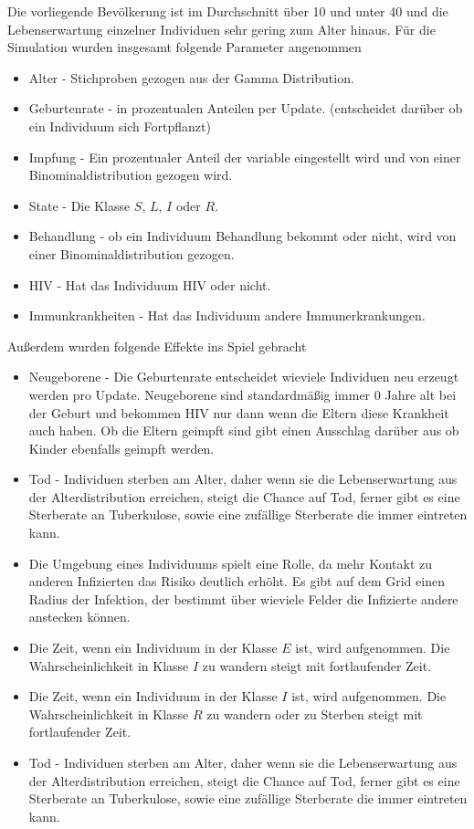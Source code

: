 \documentclass[paper=a4, fontsize=11pt, ngerman, abstract=on]{scrartcl}
\numberwithin{equation}{section} %
\numberwithin{figure}{section} %
\numberwithin{table}{section} %
\begin{document}
Die vorliegende Bevölkerung ist im Durchschnitt über 10 und unter 40 und die Lebenserwartung einzelner Individuen sehr gering zum Alter hinaus. Für die Simulation wurden insgesamt folgende Parameter angenommen

\begin{itemize}
  \item{Alter - Stichproben gezogen aus der Gamma Distribution.}
  \item{Geburtenrate - in prozentualen Anteilen per Update. (entscheidet darüber ob ein Individuum sich Fortpflanzt)}
  \item{Impfung - Ein prozentualer Anteil der variable eingestellt wird und von einer Binominaldistribution gezogen wird.}
  \item{State - Die Klasse $S$, $L$, $I$ oder $R$.}
  \item{Behandlung - ob ein Individuum Behandlung bekommt oder nicht, wird von einer Binominaldistribution gezogen.}
  \item{HIV - Hat das Individuum HIV oder nicht.}
  \item{Immunkrankheiten - Hat das Individuum andere Immunerkrankungen.}
\end{itemize}

Außerdem wurden folgende Effekte ins Spiel gebracht

\begin{itemize}
  \item{Neugeborene - Die Geburtenrate entscheidet wieviele Individuen neu erzeugt werden pro Update. Neugeborene sind standardmäßig immer 0 Jahre alt bei der Geburt und bekommen HIV nur dann wenn die Eltern diese Krankheit auch haben. Ob die Eltern geimpft sind gibt einen Ausschlag darüber aus ob Kinder ebenfalls geimpft werden.}
  \item{Tod - Individuen sterben am Alter, daher wenn sie die Lebenserwartung aus der Alterdistribution erreichen, steigt die Chance auf Tod, ferner gibt es eine Sterberate an Tuberkulose, sowie eine zufällige Sterberate die immer eintreten kann.}
  \item{Die Umgebung eines Individuums spielt eine Rolle, da mehr Kontakt zu anderen Infizierten das Risiko deutlich erhöht. Es gibt auf dem Grid einen Radius der Infektion, der bestimmt über wieviele Felder die Infizierte andere anstecken können.}
  \item{Die Zeit, wenn ein Individuum in der Klasse $E$ ist, wird aufgenommen. Die Wahrscheinlichkeit in Klasse $I$ zu wandern steigt mit fortlaufender Zeit.}
  \item{Die Zeit, wenn ein Individuum in der Klasse $I$ ist, wird aufgenommen. Die Wahrscheinlichkeit in Klasse $R$ zu wandern oder zu Sterben steigt mit fortlaufender Zeit.}
  \item{Tod - Individuen sterben am Alter, daher wenn sie die Lebenserwartung aus der Alterdistribution erreichen, steigt die Chance auf Tod, ferner gibt es eine Sterberate an Tuberkulose, sowie eine zufällige Sterberate die immer eintreten kann.}
\end{itemize}
\end{document}
